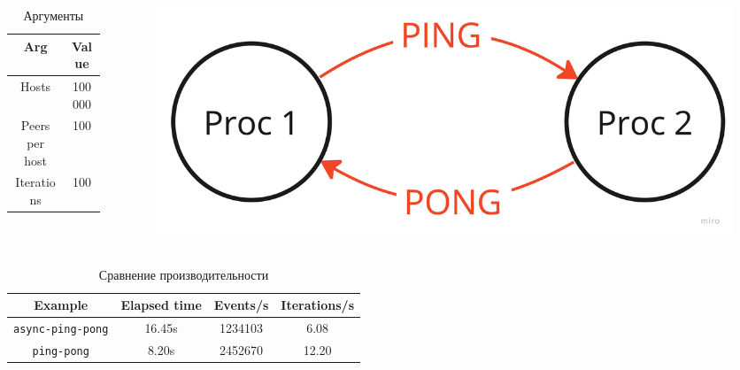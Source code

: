 \documentclass[t]{beamer}  %
\begin{document}
 \begin{frame}[fragile]
	\frametitle{\insertsection} 
	\framesubtitle{\insertsubsection}

	\begin{columns}
		\begin{column}[t]{0.3\linewidth}
			\small
			\begin{table}[H]
				\centering
				\begin{tabular}{|c|c|}
					\hline
					Arg & Value \\
					\hline
					Hosts & 100000 \\
					\hline
					Peers per host &  100\\
					\hline
					Iterations & 100 \\ 
					\hline
				\end{tabular}
			\caption*{\hspace{1cm}Аргументы}
			\end{table}
		\end{column}
		\begin{column}[t]{0.6\linewidth}
			\begin{figure}[H]
				\centering
				\includegraphics[width=0.8\linewidth]{images/ping_pong_scheme}
			\end{figure}
		\end{column}
	\end{columns}
	
	\begin{table}[H]
		\centering
		\begin{tabular}{|c|c|c|c|}
			\hline
			Example & Elapsed time & Events/s & Iterations/s \\
			\hline
			\texttt{async-ping-pong} & 16.45s & 1234103 & 6.08\\
			\hline
			\texttt{ping-pong} &  8.20s & 2452670 & 12.20\\
			\hline
		\end{tabular}
		\caption*{Сравнение производительности}
	\end{table}
 \end{frame}
\end{document}
